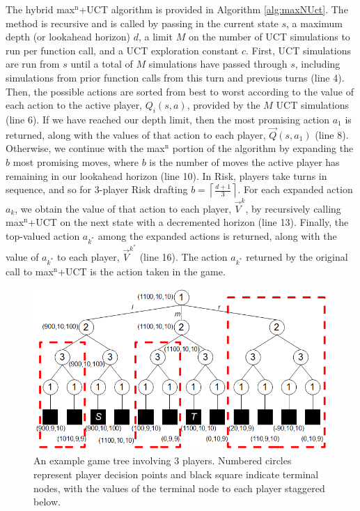 \documentclass[letterpaper]{article}
\numberwithin{equation}{section}
\numberwithin{theorem}{section}
\numberwithin{lemma}{section}
\numberwithin{df}{section}
\begin{document}
The hybrid max$^\text{n}$+UCT algorithm is provided in Algorithm \ref{alg:maxNUct}.  The method is recursive and is called by passing in the current state $s$, a maximum depth (or lookahead horizon) $d$, a limit $M$ on the number of UCT simulations to run per function call, and a UCT exploration constant $c$.  First, UCT simulations are run from $s$ until a total of $M$ simulations have passed through $s$, including simulations from prior function calls from this turn and previous turns (line 4).  Then, the possible actions are sorted from best to worst according to the value of each action to the active player, $Q_i(s,a)$, provided by the $M$ UCT simulations (line 6).  If we have reached our depth limit, then the most promising action $a_1$ is returned, along with the values of that action to each player, $\vec{Q}(s,a_1)$ (line 8).  Otherwise, we continue with the max$^\text{n}$ portion of the algorithm by expanding the $b$ most promising moves, where $b$ is the number of moves the active player has remaining in our lookahead horizon (line 10).  In Risk, players take turns in sequence, and so for 3-player Risk drafting $b = \left\lceil \frac{d + 1}{3} \right\rceil$.  For each expanded action $a_k$, we obtain the value of that action to each player, $\vec{V}^k$, by recursively calling max$^\text{n}$+UCT on the next state with a decremented horizon (line 13).  Finally, the top-valued action $a_{k^*}$ among the expanded actions is returned, along with the value of $a_{k^*}$ to each player, $\vec{V}^{k^*}$ (line 16).  The action $a_{k^*}$ returned by the original call to max$^\text{n}$+UCT is the action taken in the game.


\begin{figure}[t]
	\centering
	\includegraphics[scale=0.75]{../ForPublication/figs/MaxNExample.png}
	\caption{An example game tree involving 3 players.  Numbered circles represent player decision points and black square indicate terminal nodes, with the values of the terminal node to each player staggered below.}
	\label{fig:MaxNEx}
\end{figure}
\end{document}
